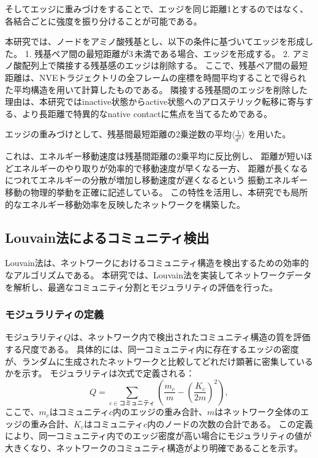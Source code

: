 そしてエッジに重みづけをすることで、エッジを同じ距離1とするのではなく、各結合ごとに強度を振り分けることが可能である。

本研究では、ノードをアミノ酸残基とし、以下の条件に基づいてエッジを形成した。
1. 残基ペア間の最短距離が3\,\text{\AA}未満である場合、エッジを形成する。
2. アミノ酸配列上で隣接する残基感のエッジは削除する。
ここで、残基ペア間の最短距離は、NVEトラジェクトリの全フレームの座標を時間平均することで得られた平均構造を用いて計算したものである。
隣接する残基間のエッジを削除した理由は、本研究ではinactive状態からactive状態へのアロステリック転移に寄与する、より長距離で特異的なnative contactに焦点を当てるためである。

エッジの重みづけとして、残基間最短距離の2乗逆数の平均$\langle \frac{1}{d^2} \rangle$ を用いた。

これは、エネルギー移動速度は残基間距離の2乗平均に反比例し、
距離が短いほどエネルギーのやり取りが効率的で移動速度が早くなる一方、
距離が長くなるにつれてエネルギーの分散が増加し移動速度が遅くなるという
振動エネルギー移動の物理的挙動を正確に記述している\cite{buchenberg2015}。
この特性を活用し、本研究でも局所的なエネルギー移動効率を反映したネットワークを構築した。


\subsection{Louvain法によるコミュニティ検出}

Louvain法は、ネットワークにおけるコミュニティ構造を検出するための効率的なアルゴリズムである。
本研究では、Louvain法\cite{Blondel2008}を実装してネットワークデータを解析し、最適なコミュニティ分割とモジュラリティの評価を行った。
\subsubsection{モジュラリティの定義}
モジュラリティ$Q$は、ネットワーク内で検出されたコミュニティ構造の質を評価する尺度である。
具体的には、同一コミュニティ内に存在するエッジの密度が、ランダムに生成されたネットワークと比較してどれだけ顕著に密集しているかを示す。
モジュラリティは次式で定義される：
\begin{equation}
Q = \sum_{c \in \text{コミュニティ}} \left( \frac{m_c}{m} - \left( \frac{K_c}{2m} \right)^2 \right),
\end{equation}
ここで、$m_c$はコミュニティ$c$内のエッジの重み合計、$m$はネットワーク全体のエッジの重み合計、$K_c$はコミュニティ$c$内のノードの次数の合計である。
この定義により、同一コミュニティ内でのエッジ密度が高い場合にモジュラリティの値が大きくなり、ネットワークのコミュニティ構造がより明確であることを示す。

